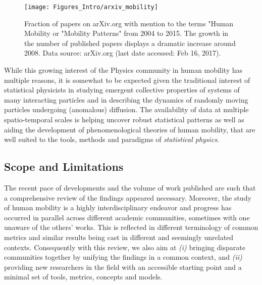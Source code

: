 \begin{figure}[t!]
\texttt{[image: Figures\_Intro/arxiv\_mobility]}
\caption{Fraction of papers on arXiv.org with mention to the terms "Human Mobility or "Mobility Patterns" from 2004 to 2015. The growth in the number of published papers displays a dramatic increase around 2008. Data source: arXiv.org (last date accessed: Feb 16, 2017).}
\label{fig:pubs}
\end{figure}

While this growing interest of the Physics community in human mobility has multiple reasons, it is somewhat to be expected given the traditional interest of statistical physicists in studying emergent collective properties of systems of many interacting particles and in describing the dynamics of randomly moving particles undergoing (anomalous) diffusion. The availability of data at multiple spatio-temporal scales is helping uncover robust statistical patterns as well as aiding the development of phenomenological theories of human mobility, that are well suited to the tools, methods and paradigms of \emph{statistical physics}. 

\subsection{Scope and Limitations}

The recent pace of developments and the volume of work published are such that a comprehensive review of the findings appeared necessary. Moreover, the study of human mobility is a highly interdisciplinary endeavor and progress has occurred in parallel across different academic communities, sometimes with one unaware of the others' works. This is reflected in different terminology of common metrics and similar results being cast in different and seemingly unrelated contexts. Consequently with this review, we also aim at \emph{(i)} bringing disparate communities together by unifying the findings in a common context, and \emph {(ii)} providing new researchers in the field with
an accessible starting point and a minimal set of tools, metrics, concepts and models.


